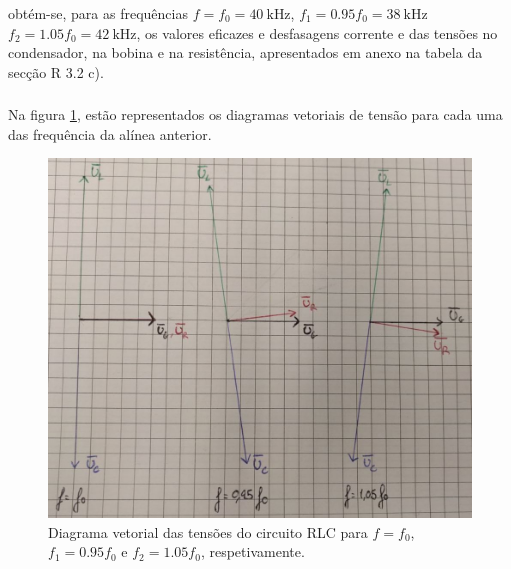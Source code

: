 \documentclass[a4paper, titlepage, portuguese]{article}
\begin{document}
		 obtém-se, para as frequências $f = f_0 = \SI{40}{\kilo\hertz}$, $f_1 = 0.95f_0= \SI{38}{\kilo\hertz}$ $f_2 = 1.05f_0 = \SI{42}{\kilo\hertz}$, os valores eficazes e desfasagens corrente e das tensões no condensador, na bobina e na resistência, apresentados em anexo na tabela da secção R 3.2 c).

	\subsubsection{}

		Na figura \ref{fig:diag_vect}, estão representados os diagramas vetoriais de tensão para cada uma das frequência da alínea anterior.

		\begin{figure}[h]
			\centering
			\includegraphics[width=0.6\linewidth]{diag_vect.jpeg}
			\caption{Diagrama vetorial das tensões do circuito RLC para $f=f_0$, $f_1=0.95f_0$ e $f_2=1.05f_0$, respetivamente.}
			\label{fig:diag_vect}
		\end{figure}


\end{document}
